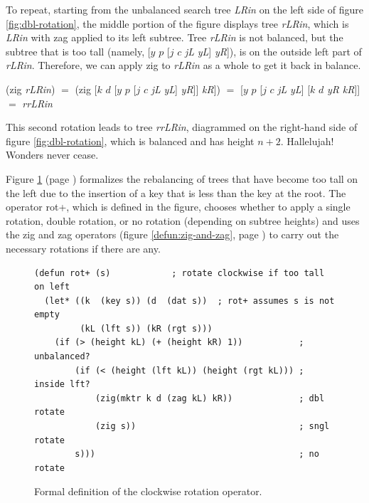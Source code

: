 To repeat, starting from the unbalanced search tree \emph{LRin}
on the left side of figure \ref{fig:dbl-rotation},
the middle portion of the figure displays tree \emph{rLRin},
which is \emph{LRin} with \textsf{zag} applied to its left subtree.
Tree \emph{rLRin}
is not balanced, but the subtree that is too tall
(namely, \textsf{[$y$ $p$ [$j$ $c$} \emph{jL} \emph{yL}\textsf{]} \emph{yR}\textsf{]}),
is on the outside left part of \emph{rLRin}.
Therefore, we can apply \textsf{zig} to \emph{rLRin} as a whole
to get it back in balance.
\begin{center}
\textsf{(zig} \emph{rLRin}\textsf{)} $=$
\textsf{(zig [$k$ $d$ [$y$ $p$ [$j$ $c$} \emph{jL} \emph{yL}\textsf{]} \emph{yR}\textsf{]]} \emph{kR}\textsf{])} $=$
\textsf{[$y$ $p$ [$j$ $c$} \emph{jL} \emph{yL}\textsf{] [$k$ $d$} \emph{yR} \emph{kR}\textsf{]]}
$=$ \emph{rrLRin}
\end{center}
This second rotation leads to
tree \emph{rrLRin},
diagrammed on the right-hand side of
figure \ref{fig:dbl-rotation},
which is balanced and has height $n+2$.
Hallelujah! Wonders never cease.

Figure \ref{defun:rot+} (page \pageref{defun:rot+})
formalizes the rebalancing of trees
that have become too tall on the left due to the
insertion of a key that is less than the key at the root.
The operator \textsf{rot}+, which is defined in the figure,
chooses whether to apply a single rotation,
double rotation, or no rotation
(depending on subtree heights)
and uses the \textsf{zig} and \textsf{zag} operators
(figure \ref{defun:zig-and-zag}, page \pageref{defun:zig-and-zag})
to carry out the necessary rotations if there are any.

\begin{figure}
\begin{center}
\begin{code}
\begin{verbatim}
(defun rot+ (s)            ; rotate clockwise if too tall on left
  (let* ((k  (key s)) (d  (dat s))  ; rot+ assumes s is not empty
         (kL (lft s)) (kR (rgt s)))
    (if (> (height kL) (+ (height kR) 1))           ; unbalanced?
        (if (< (height (lft kL)) (height (rgt kL))) ; inside lft?
            (zig(mktr k d (zag kL) kR))             ; dbl rotate
            (zig s))                                ; sngl rotate
        s)))                                        ; no rotate
\end{verbatim}
\end{code}
\end{center}
\caption{Formal definition of the clockwise rotation operator.}
\label{defun:rot+}
\end{figure}

